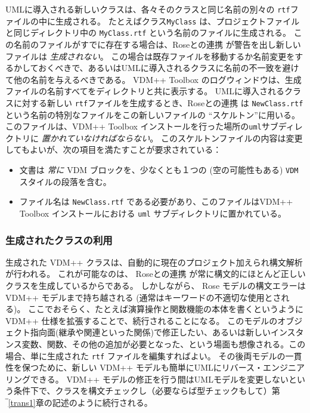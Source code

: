 \documentclass[\pformat,12pt]{jarticle}
\newcommand{\vdmpp}{VDM++}
\newcommand{\ToolboxName}{\vdmpp{} Toolbox}
\newcommand{\link}{Roseとの連携}
\begin{document}
UMLに導入される新しいクラスは、各々そのクラスと同じ名前の別々の {\tt  rtf}ファイルの中に生成される。
たとえばクラス{\tt MyClass} は、プロジェクトファイルと同じディレクトリ中の {\tt  MyClass.rtf} という名前のファイルに生成される。
この名前のファイルがすでに存在する場合は、\link{} が警告を出し新しいファイルは {\em 生成されない}。
この場合は既存ファイルを移動するか名前変更をするかしておくべきで、あるいはUMLに導入されるクラスに名前の不一致を避けて他の名前を与えるべきである。
\vdmpp{} Toolbox のログウィンドウは、生成ファイルの名前すべてをディレクトリと共に表示する。
UMLに導入されるクラスに対する新しい {\tt rtf}ファイルを生成するとき、\link{} は {\tt NewClass.rtf} という名前の特別なファイルをこの新しいファイルの ``スケルトン''に用いる。
このファイルは、\ToolboxName{} インストールを行った場所の{\tt uml}サブディレクトリに {\em 置かれていなければならない}。
 このスケルトンファイルの内容は変更してもよいが、次の項目を満たすことが要求されている：

\begin{itemize}
\item 文書は {\em 常に}  VDM ブロックを、少なくとも１つの (空の可能性もある)  {\tt VDM}スタイルの段落を含む。
\item ファイル名は {\tt NewClass.rtf} である必要があり、このファイルは\ToolboxName{} インストールにおける {\tt uml} サブディレクトリに置かれている。
\end{itemize}


\subsubsection*{生成されたクラスの利用}

生成された \vdmpp{} クラスは、自動的に現在のプロジェクト加えられ構文解析が行われる。
これが可能なのは、 \link{} が常に構文的にほとんど正しいクラスを生成しているからである。
しかしながら、 Rose モデルの構文エラーは VDM++ モデルまで持ち越される (通常はキーワードの不適切な使用とされる)。
ここでおそらく、たとえば演算操作と関数機能の本体を書くというように\vdmpp{} 仕様を拡張することで、続行されることになる。
 このモデルのオブジェクト指向面(継承や関連といった関係)で修正したい、あるいは新しいインスタンス変数、関数、その他の追加が必要となった、という場面も想像される。この場合、単に生成された {\tt rtf} ファイルを編集すればよい。
その後両モデルの一貫性を保つために、新しい \vdmpp{} モデルも簡単にUMLにリバース・エンジニアリングできる。
\vdmpp{} モデルの修正を行う間はUMLモデルを変更しないという条件下で、クラスを構文チェックし（必要ならば型チェックもして）第‾\ref{trans1}章の記述のように続行される。
\end{document}
